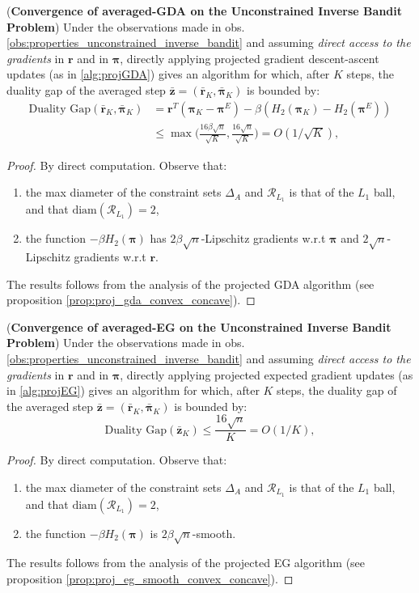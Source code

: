 \begin{proposition}
    (\textbf{Convergence of averaged-GDA on the Unconstrained Inverse Bandit Problem})
    Under the observations made in obs. \ref{obs:properties_unconstrained_inverse_bandit} and assuming \textit{direct access to the gradients} in $\bm{r}$ and in $\bm{\pi}$, directly applying projected gradient descent-ascent updates (as in \ref{alg:projGDA}) gives an algorithm for which, after $K$ steps, the duality gap of the averaged step $\bar{\bm{z}}=(\bar{\bm{r}}_K,\bar{\bm{\pi}}_K) $ is bounded by:
    \begin{align*}            
        \text{Duality Gap}(\bar{\bm{r}}_K,\bar{\bm{\pi}}_K) &=  \bm{r}^T(\bm{\pi}_K-\bm{\pi}^E) - \beta (H_2(\bm{\pi}_K) -  H_2(\bm{\pi}^E) ) \\ &\leq \max \Biggl(\frac{16 \beta\sqrt{n}}{\sqrt{K}},\frac{16 \sqrt{n} }{\sqrt{K}} \Biggr) = O(1/\sqrt{K}),
    \end{align*}

\end{proposition}
\begin{proof}
    By direct computation. Observe that:
    \begin{enumerate}
        \item the max diameter of the constraint sets $\Delta_A$ and $\mathcal{R}_{L_1}$ is that of the $L_1$ ball, and that $\text{diam}(\mathcal{R}_{L_1}) = 2$,
        \item the function $-\beta H_2(\bm{\pi})$ has $2 \beta \sqrt{n}$-Lipschitz gradients w.r.t $\bm{\pi}$ and $2 \sqrt{n}$-Lipschitz gradients w.r.t $\bm{r}$.
    \end{enumerate}
    The results follows from the analysis of the projected GDA algorithm (see proposition \ref{prop:proj_gda_convex_concave}).
\end{proof}

\begin{proposition}
    (\textbf{Convergence of averaged-EG on the Unconstrained Inverse Bandit Problem})
    Under the observations made in obs. \ref{obs:properties_unconstrained_inverse_bandit} and assuming \textit{direct access to the gradients} in $\bm{r}$ and in $\bm{\pi}$, directly applying projected expected gradient updates (as in \ref{alg:projEG}) gives an algorithm for which, after $K$ steps, the duality gap of the averaged step $\bar{\bm{z}}=(\bar{\bm{r}}_K,\bar{\bm{\pi}}_K) $ is bounded by:
    \[ 
        \text{Duality Gap}(\bar{\bm{z}}_K) \leq \frac{16 \sqrt{n}}{K} = O(1/{K}),
    \]
\end{proposition}
\begin{proof}
    By direct computation. Observe that:
    \begin{enumerate}
        \item the max diameter of the constraint sets $\Delta_A$ and $\mathcal{R}_{L_1}$ is that of the $L_1$ ball, and that $\text{diam}(\mathcal{R}_{L_1}) = 2$,
        \item the function $-\beta H_2(\bm{\pi})$ is $2 \beta \sqrt{n}$-smooth.
    \end{enumerate}
    The results follows from the analysis of the projected EG algorithm (see proposition \ref{prop:proj_eg_smooth_convex_concave}).
\end{proof}


